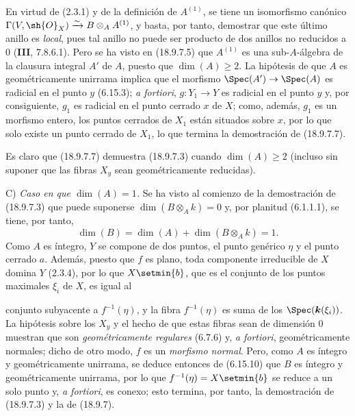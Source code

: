 En virtud de (2.3.1) y de la definición de $A^{(1)}$, se tiene un isomorfismo canónico $\Gamma(V,\sh{O}_X)\xrightarrow{\sim}B\otimes_A A^{(1)}$, y basta, por tanto, demostrar que este último anillo es \emph{local}, pues tal anillo no puede ser producto de dos anillos no reducidos a 0 (\textbf{III}, 7.8.6.1). Pero se ha visto en (18.9.7.5) que $A^{(1)}$ es una sub-$A$-álgebra de la clausura integral $A'$ de $A$, puesto que $\dim(A)\geq 2$. La hipótesis de que $A$ es geométricamente unirrama implica que el morfismo $\Spec(A')\to\Spec(A)$ es radicial en el punto $y$ (6.15.3); \emph{a fortiori}, $g:Y_1\to Y$ es radicial en el punto $y$ y, por consiguiente, $g_1$ es radicial en el punto cerrado $x$ de $X$; como, además, $g_1$ es un morfismo entero, los puntos cerrados de $X_1$ están situados sobre $x$, por lo que solo existe un punto cerrado de $X_1$, lo que termina la demostración de (18.9.7.7).

Es claro que (18.9.7.7) demuestra (18.9.7.3) cuando $\dim(A)\geq 2$ (incluso sin suponer que las fibras $X_y$ sean geométricamente reducidas).

C) \emph{Caso en que $\dim(A)=1$.} Se ha visto al comienzo de la demostración de (18.9.7.3) que puede suponerse $\dim(B\otimes_A k)=0$ y, por planitud (6.1.1.1), se tiene, por tanto,
\[
  \dim(B)=\dim(A)+\dim(B\otimes_A k)=1.
\]
Como $A$ es íntegro, $Y$ se compone de dos puntos, el punto genérico $\eta$ y el punto cerrado $a$. Además, puesto que $f$ es plano, toda componente irreducible de $X$ domina $Y$ (2.3.4), por lo que $X\setmin\{b\}$, que es el conjunto de los puntos maximales $\xi_i$ de $X$, es igual al


conjunto subyacente a $f^{-1}(\eta)$, y la fibra $f^{-1}(\eta)$ es suma de los $\Spec(\boldsymbol k(\xi_i))$. La hipótesis sobre los $X_y$ y el hecho de que estas fibras sean de dimensión 0 muestran que son \emph{geométricamente regulares} (6.7.6) y, \emph{a fortiori}, geométricamente normales; dicho de otro modo, $f$ es un \emph{morfismo normal}. Pero, como $A$ es íntegro y geométricamente unirrama, se deduce entonces de (6.15.10) que $B$ es íntegro y geométricamente unirrama, por lo que $f^{-1}(\eta)=X\setmin\{b\}$ se reduce a un solo punto y, \emph{a fortiori}, es conexo; esto termina, por tanto, la demostración de (18.9.7.3) y la de (18.9.7).

